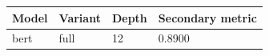 \begin{tabular}{llll}
\hline
Model & Variant & Depth & Secondary metric \\
\hline
bert & full & 12 & 0.8900 \\
\hline
\end{tabular}
